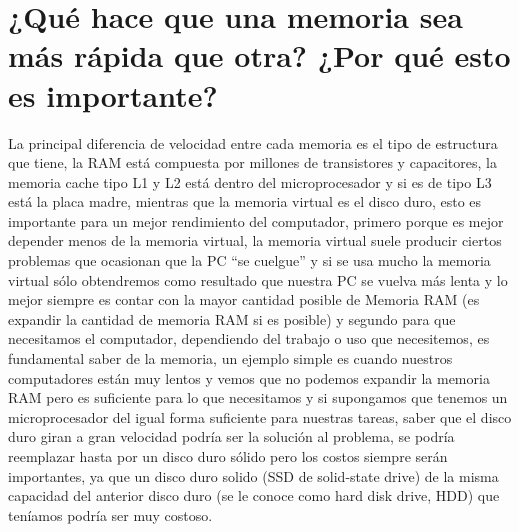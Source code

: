 \documentclass{article}
\begin{document}
\section{¿Qué hace que una memoria sea más rápida que otra? ¿Por qué esto es importante?}
La principal diferencia de velocidad entre cada memoria es el tipo de estructura que tiene, la RAM está compuesta por millones de transistores y capacitores, la memoria cache tipo L1 y L2 está dentro del microprocesador y si es de tipo L3 está la placa madre, mientras que la memoria virtual es el disco duro, esto es importante para un mejor rendimiento del computador, primero porque es mejor depender menos de la memoria virtual, la memoria virtual suele producir ciertos problemas que ocasionan que la PC “se cuelgue” y si se usa mucho la memoria virtual sólo obtendremos como resultado que nuestra PC se vuelva más lenta \cite{Venturini} y lo mejor siempre es contar con la mayor cantidad posible de Memoria RAM (es expandir la cantidad de memoria RAM si es posible) y segundo para que necesitamos el computador, dependiendo del trabajo o uso que necesitemos, es fundamental saber de la memoria, un ejemplo simple es cuando nuestros computadores están muy lentos y vemos que no podemos expandir la memoria RAM pero es suficiente para lo que necesitamos y si supongamos que tenemos un microprocesador del igual forma suficiente para nuestras tareas, saber que el disco duro giran a gran velocidad podría ser la solución al problema, se podría reemplazar hasta por un disco duro sólido pero los costos siempre serán importantes, ya que un disco duro solido (SSD de solid-state drive) de la misma capacidad del anterior disco duro (se le conoce como hard disk drive, HDD) que teníamos podría ser muy costoso.





\end{document}
